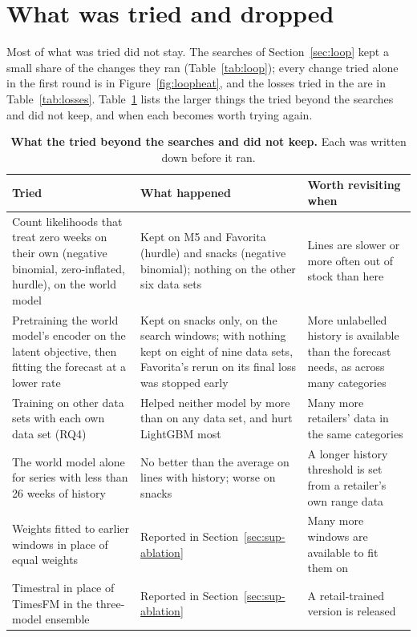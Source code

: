 \section{What was tried and dropped}
\label{sec:dropped}

Most of what was tried did not stay. The searches of Section~\ref{sec:loop} kept
a small share of the changes they ran (Table~\ref{tab:loop}); every change tried
alone in the first round is in Figure~\ref{fig:loopheat}, and the losses tried in
the \firstver{} are in Table~\ref{tab:losses}. Table~\ref{tab:dropped} lists
the larger things the \revn{} tried beyond the searches and did not keep, and
when each becomes worth trying again.

\begin{table}[t]
\centering
\caption{\textbf{What the \revn{} tried beyond the searches and did not keep.}
Each was written down before it ran.}
\label{tab:dropped}
\footnotesize
\renewcommand{\arraystretch}{1.15}
\begin{tabular}{p{}p{}p{}}
\toprule
\textbf{Tried} & \textbf{What happened} & \textbf{Worth revisiting when} \\
\midrule
Count likelihoods that treat zero weeks on their own (negative binomial, zero-inflated, hurdle), on the world model & Kept on M5 and Favorita (hurdle) and snacks (negative binomial); nothing on the other six data sets & Lines are slower or more often out of stock than here \\
Pretraining the world model's encoder on the latent objective, then fitting the forecast at a lower rate & Kept on snacks only, on the search windows; with nothing kept on eight of nine data sets, Favorita's rerun on its final loss was stopped early & More unlabelled history is available than the forecast needs, as across many categories \\
Training on other data sets with each own data set (RQ4) & Helped neither model by more than \rqPoolGainMax{} on any data set, and hurt LightGBM most & Many more retailers' data in the same categories \\
The world model alone for series with less than 26 weeks of history & No better than the average on lines with history; worse on snacks & A longer history threshold is set from a retailer's own range data \\
Weights fitted to earlier windows in place of equal weights & Reported in Section~\ref{sec:sup-ablation} & Many more windows are available to fit them on \\
Timestral in place of TimesFM in the three-model ensemble & Reported in Section~\ref{sec:sup-ablation} & A retail-trained version is released \\
\bottomrule
\end{tabular}
\end{table}

